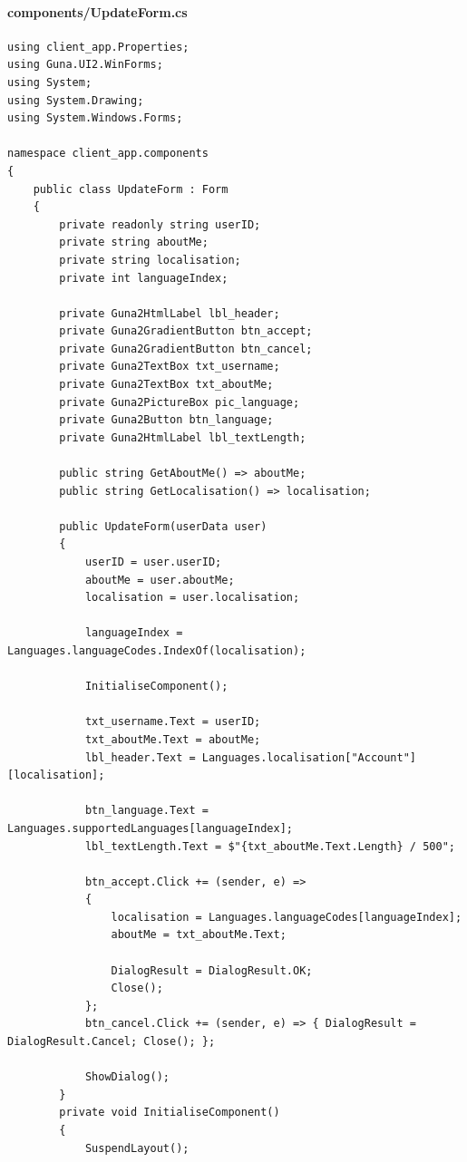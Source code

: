 \documentclass{article}
\begin{document}
\paragraph{components/UpdateForm.cs}\label{client/components/updateform.cs}
\begin{verbatim}
using client_app.Properties;
using Guna.UI2.WinForms;
using System;
using System.Drawing;
using System.Windows.Forms;

namespace client_app.components
{
	public class UpdateForm : Form
	{
		private readonly string userID;
		private string aboutMe;
		private string localisation;
		private int languageIndex;

		private Guna2HtmlLabel lbl_header;
		private Guna2GradientButton btn_accept;
		private Guna2GradientButton btn_cancel;
		private Guna2TextBox txt_username;
		private Guna2TextBox txt_aboutMe;
		private Guna2PictureBox pic_language;
		private Guna2Button btn_language;
		private Guna2HtmlLabel lbl_textLength;

		public string GetAboutMe() => aboutMe;
		public string GetLocalisation() => localisation;

		public UpdateForm(userData user)
		{
			userID = user.userID;
			aboutMe = user.aboutMe;
			localisation = user.localisation;

			languageIndex = Languages.languageCodes.IndexOf(localisation);

			InitialiseComponent();

			txt_username.Text = userID;
			txt_aboutMe.Text = aboutMe;
			lbl_header.Text = Languages.localisation["Account"][localisation];

			btn_language.Text = Languages.supportedLanguages[languageIndex];
			lbl_textLength.Text = $"{txt_aboutMe.Text.Length} / 500";

			btn_accept.Click += (sender, e) =>
			{
				localisation = Languages.languageCodes[languageIndex];
				aboutMe = txt_aboutMe.Text;

				DialogResult = DialogResult.OK;
				Close();
			};
			btn_cancel.Click += (sender, e) => { DialogResult = DialogResult.Cancel; Close(); };

			ShowDialog();
		}
		private void InitialiseComponent()
		{
			SuspendLayout();


\end{verbatim}
\end{document}
